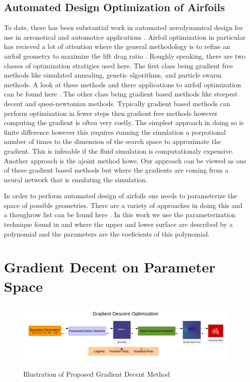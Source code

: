 \documentclass{article} %
\begin{document}
\subsection{Automated Design Optimization of Airfoils}

To date, there has been substantial work in automated aerodynamical design for use in aeronotical and automotice applications \cite{ando2010automotive} \cite{demultiplexer}. Airfoil optimization in particular has recieved a lot of attention where the general methodology is to refine an airfoil geometry to maximize the lift drag ratio \cite{drela1998pros}. Roughly speaking, there are two classes of optimization stratigies used here. The first class being gradient free methods like simulated annealing, genetic algorithms, and particle swarm methods. A look at these methods and there applications to airfoil optimization can be found here \cite{mukesh2012application}. The other class being gradient based methods like steepest decent and quesi-newtonian methods. Typically gradient based methods can perform optimization in fewer steps then gradient free methods however computing the gradient is often very costly. The simplest approach in doing so is finite difference however this requires running the simulation a porpotional number of times to the dimension of the search space to approximate the gradient. This is infesable if the fluid simulation is computationaly expensive. Another approach is the ajoint method howe. Our approach can be viewed as one of these gradient based methods but where the gradients are coming from a neural network that is emulating the simulation.

In order to perform automated design of airfoils one needs to parameterize the space of possible geometries. There are a variety of approaches in doing this and a thoughrow list can be found here \cite{salunke2014airfoil}. In this work we use the parameterization technique found in \cite{lane2009surface} and \cite{hilton2007universal} where the upper and lower surface are described by a polynomial and the parameters are the coeficients of this polynomial.

\section{Gradient Decent on Parameter Space}

\begin{figure}[h]
\begin{center}
\includegraphics[scale=0.34]{./gradient_descent_optimization.pdf}
\label{gradient_descent_optimization}
\end{center}
\caption{Illustration of Proposed Gradient Decent Method}
\end{figure}
\end{document}
